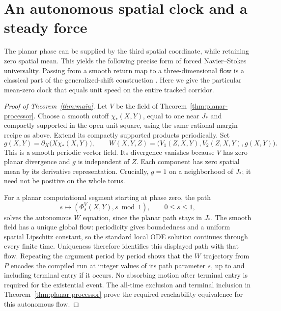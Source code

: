 \documentclass[11pt]{article}
\theoremstyle{remark}\newtheorem{remark}[theorem]{Remark}
\begin{document}
\section{An autonomous spatial clock and a steady force}
\label{sec:lagrangian}

The planar phase can be supplied by the third spatial coordinate,
while retaining zero spatial mean.  This yields the following precise
form of forced Navier--Stokes universality.
Passing from a smooth return map to a three-dimensional flow is a
classical part of the generalized-shift construction
\cite[Section~6]{Moore1991}. Here we give the particular mean-zero
clock that equals unit speed on the entire tracked corridor.

\begin{proof}[Proof of Theorem~\ref{thm:main}]


Let $V$ be the field of Theorem~\ref{thm:planar-processor}.  Choose a smooth
cutoff $\chi_*(X,Y)$, equal to one near $J_*$ and compactly supported
in the open unit square, using the same rational-margin recipe as
above.  Extend its compactly supported products periodically.  Set
\begin{equation}\label{eq:autonomous-suspension}
 g(X,Y)=\partial_X\big(X\chi_*(X,Y)\big),\qquad
 W(X,Y,Z)=\big(V_1(Z,X,Y),V_2(Z,X,Y),g(X,Y)\big).
\end{equation}
This is a smooth periodic vector field.  Its divergence vanishes
because $V$ has zero planar divergence and $g$ is independent of $Z$.
Each component has zero spatial mean by its derivative representation.
Crucially, $g=1$ on a neighborhood of $J_*$; it need not be positive
on the whole torus.

For a planar computational segment starting at phase zero, the path
\[
 s\longmapsto (\Phi_s^V(X,Y),s\bmod1),\qquad 0\le s\le1,
\]
solves the autonomous $W$ equation, since the planar path stays in
$J_*$.  The smooth field has a unique global flow: periodicity gives
boundedness and a uniform spatial Lipschitz constant, so the standard
local ODE solution continues through every finite time.  Uniqueness
therefore identifies this displayed path with that flow.  Repeating
the argument period by period shows that the $W$ trajectory from $P$
encodes the compiled run at integer values of its path parameter $s$,
up to and including terminal entry if it occurs.  No absorbing motion
after terminal entry is required for the existential event.
The all-time exclusion and terminal inclusion in
Theorem~\ref{thm:planar-processor} prove the required reachability equivalence
for this autonomous flow.


\end{proof}
\end{document}
